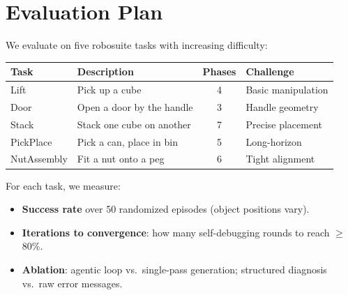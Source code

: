 \documentclass[11pt]{article}
\begin{document}
\section{Evaluation Plan}
\label{sec:evaluation}

We evaluate on five robosuite tasks with increasing difficulty:

\begin{table}[h]
\centering
\small
\begin{tabular}{@{}llcl@{}}
\toprule
\textbf{Task} & \textbf{Description} & \textbf{Phases} & \textbf{Challenge} \\
\midrule
Lift        & Pick up a cube                & 4  & Basic manipulation \\
Door        & Open a door by the handle     & 3  & Handle geometry \\
Stack       & Stack one cube on another     & 7  & Precise placement \\
PickPlace   & Pick a can, place in bin      & 5  & Long-horizon \\
NutAssembly & Fit a nut onto a peg          & 6  & Tight alignment \\
\bottomrule
\end{tabular}
\end{table}

\noindent For each task, we measure:
\begin{itemize}[nosep]
    \item \textbf{Success rate} over 50 randomized episodes (object positions vary).
    \item \textbf{Iterations to convergence}: how many self-debugging rounds to reach $\geq$80\%.
    \item \textbf{Ablation}: agentic loop vs.\ single-pass generation; structured diagnosis vs.\ raw error messages.
\end{itemize}


\end{document}
